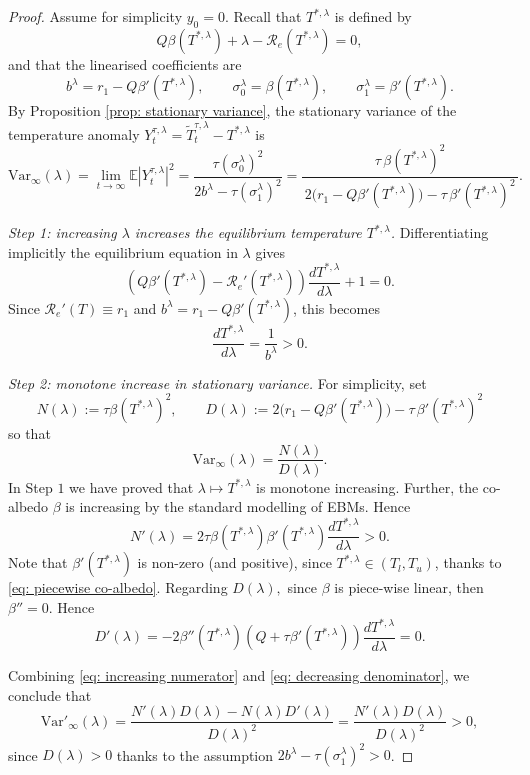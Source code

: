 \documentclass[10pt]{amsart}
\numberwithin{equation}{section}
\begin{document}
\begin{proof}
Assume for simplicity $y_0 = 0$. Recall that \(T^{*,\lambda}\) is defined by
$$
Q\beta(T^{*,\lambda})+\lambda-\mathcal R_e(T^{*,\lambda})=0,
$$
and that the linearised coefficients are
$$
b^\lambda = r_1 - Q\beta'(T^{*,\lambda}), 
\qquad 
\sigma_0^\lambda=\beta(T^{*,\lambda}), 
\qquad 
\sigma_1^\lambda=\beta'(T^{*,\lambda}).
$$
By Proposition \ref{prop: stationary variance}, the stationary variance of the temperature anomaly \(Y_t^{\tau,\lambda} =\widetilde T_t^{\tau,\lambda}-T^{*,\lambda}\) is
$$
\mathrm{Var}_\infty(\lambda)
=\lim_{t\to\infty}\mathbb E|Y_t^{\tau,\lambda} |^2
=\frac{\tau(\sigma_0^\lambda)^2}{2b^\lambda-\tau(\sigma_1^\lambda)^2}
=
\frac{\tau\,\beta(T^{*,\lambda})^2}{\,2\bigl(r_1-Q\beta'(T^{*,\lambda})\bigr)-\tau\,\beta'(T^{*,\lambda})^2\,}.
$$

\textit{Step 1: increasing $\lambda$ increases the equilibrium temperature $T^{*,\lambda}$.}
Differentiating implicitly the equilibrium equation in \(\lambda\) gives
$$
\left(Q\beta'(T^{*,\lambda})-\mathcal{ R}_e'(T^{*,\lambda})\right) \frac{dT^{*,\lambda}}{d\lambda}+1=0.
$$
Since $\mathcal R_e'(T)\equiv r_1 $ and $b^\lambda=r_1-Q\beta'(T^{*,\lambda})$, this becomes
$$
\frac{d T^{*,\lambda }}{d  \lambda}=\frac{1}{b^\lambda}>0.
$$

\textit{Step 2: monotone increase in stationary variance.}
For simplicity, set
$$
N(\lambda):= \tau \beta(T^{*,\lambda})^2,  \qquad D(\lambda) := 2\bigl(r_1-Q\beta'(T^{*,\lambda})\bigr)-\tau\,\beta'(T^{*,\lambda})^2
$$
so that
$$
\mathrm{Var}_\infty (\lambda) = \frac{N(\lambda )}{D(\lambda)}.
$$
In Step $1$ we have proved that $\lambda \mapsto T^{*,\lambda}$ is monotone increasing. Further, the co-albedo $\beta$ is increasing by the standard modelling of EBMs. Hence
\begin{equation}
    N'(\lambda) = 2 \tau \beta(T^{*,\lambda}) \beta'(T^{*,\lambda }) \frac{d T^{*,\lambda }}{d  \lambda} >0.
    \label{eq: increasing numerator}
\end{equation}
Note that $\beta'(T^{*,\lambda})$ is non-zero (and positive), since $T^{*,\lambda} \in (T_l, T_u)$, thanks to \eqref{eq: piecewise co-albedo}. Regarding $D(\lambda),$ since $\beta$ is piece-wise linear, then $\beta'' = 0.$ Hence
\begin{equation}
D'(\lambda) =- 2 \beta '' (T^{*,\lambda})( Q+ \tau \beta ' (T^{*,\lambda})) \frac{d T^{*,\lambda}}{d\lambda}=0.
    \label{eq: decreasing denominator}
\end{equation}

Combining \eqref{eq: increasing numerator} and \eqref{eq: decreasing denominator}, we conclude that $$
\mathrm{Var}'_\infty (\lambda) = \frac{N'(\lambda ) D(\lambda ) - N(\lambda) D'(\lambda)}{D(\lambda)^2} = \frac{N'(\lambda ) D(\lambda )}{D(\lambda)^2}>0,
$$
since $D(\lambda)>0$ thanks to the assumption $2b^\lambda - \tau (\sigma_1^\lambda)^2 >0$.
\end{proof}
\end{document}
